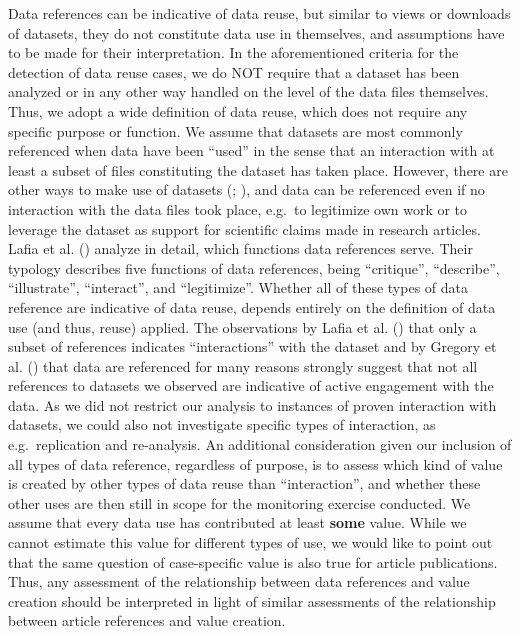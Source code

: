 \documentclass[
  letterpaper,
  DIV=11,
  numbers=noendperiod]{scrartcl}
\begin{document}
Data references can be indicative of data reuse, but similar to views or
downloads of datasets, they do not constitute data use in themselves,
and assumptions have to be made for their interpretation. In the
aforementioned criteria for the detection of data reuse cases, we do NOT
require that a dataset has been analyzed or in any other way handled on
the level of the data files themselves. Thus, we adopt a wide definition
of data reuse, which does not require any specific purpose or function.
We assume that datasets are most commonly referenced when data have been
``used'' in the sense that an interaction with at least a subset of
files constituting the dataset has taken place. However, there are other
ways to make use of datasets (; ), and data can be
referenced even if no interaction with the data files took place,
e.g.~to legitimize own work or to leverage the dataset as support for
scientific claims made in research articles. Lafia et al.
() analyze in detail, which functions data
references serve. Their typology describes five functions of data
references, being ``critique'', ``describe'', ``illustrate'',
``interact'', and ``legitimize''. Whether all of these types of data
reference are indicative of data reuse, depends entirely on the
definition of data use (and thus, reuse) applied. The observations by
Lafia et al. () that only a subset of
references indicates ``interactions'' with the dataset and by Gregory et
al. () that data are
referenced for many reasons strongly suggest that not all references to
datasets we observed are indicative of active engagement with the data.
As we did not restrict our analysis to instances of proven interaction
with datasets, we could also not investigate specific types of
interaction, as e.g.~replication and re-analysis. An additional
consideration given our inclusion of all types of data reference,
regardless of purpose, is to assess which kind of value is created by
other types of data reuse than ``interaction'', and whether these other
uses are then still in scope for the monitoring exercise conducted. We
assume that every data use has contributed at least \textbf{some} value.
While we cannot estimate this value for different types of use, we would
like to point out that the same question of case-specific value is also
true for article publications. Thus, any assessment of the relationship
between data references and value creation should be interpreted in
light of similar assessments of the relationship between article
references and value creation.
\end{document}
